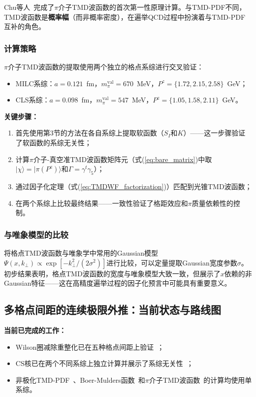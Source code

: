 \documentclass[12pt,a4paper]{ctexart}
\theoremstyle{definition}
\begin{document}
Chu等人~\cite{Chu2023TMDWF}完成了$\pi$介子TMD波函数的首次第一性原理计算。与TMD-PDF不同，TMD波函数是\textbf{概率幅}（而非概率密度），在遍举QCD过程中扮演着与TMD-PDF互补的角色。

\subsubsection{计算策略}

$\pi$介子TMD波函数的提取使用两个独立的格点系综进行交叉验证：
\begin{itemize}
    \item MILC系综：$a = 0.121$~fm，$m_\pi^{\text{val}} = 670$~MeV，$P^z = \{1.72, 2.15, 2.58\}$~GeV；
    \item CLS系综：$a = 0.098$~fm，$m_\pi^{\text{val}} = 547$~MeV，$P^z = \{1.05, 1.58, 2.11\}$~GeV。
\end{itemize}

\textbf{关键步骤：}
\begin{enumerate}
    \item 首先使用第3节的方法在各自系综上提取软函数（$S_I$和$K$）——这一步骤验证了软函数的系综无关性；
    \item 计算$\pi$介子-真空准TMD波函数矩阵元（式(\ref{eq:bare_matrix})中取$|\chi\rangle = |\pi(P^z)\rangle$和$\Gamma = \gamma^t\gamma_5$）；
    \item 通过因子化定理（式(\ref{eq:TMDWF_factorization})）匹配到光锥TMD波函数；
    \item 在两个系综上比较最终结果——一致性验证了格距效应和$\pi$质量依赖性的控制。
\end{enumerate}

\subsubsection{与唯象模型的比较}

将格点TMD波函数与唯象学中常用的Gaussian模型$\Psi(x, k_\perp) \propto \exp[-k_\perp^2/(2\sigma^2)]$进行比较，可以定量提取Gaussian宽度参数$\sigma$。初步结果表明，格点TMD波函数的宽度与唯象模型大致一致，但展示了$x$依赖的非Gaussian特征——这在高精度遍举过程的因子化预言中可能具有重要意义。

\subsection{多格点间距的连续极限外推：当前状态与路线图}

\textbf{当前已完成的工作：}
\begin{itemize}
    \item Wilson圈减除重整化已在五种格点间距上验证~\cite{Zhang2022renormTMD}；
    \item CS核已在两个不同系综上独立计算并展示了系综无关性~\cite{Chu2023soft}；
    \item 非极化TMD-PDF~\cite{He2024unpolTMD}、Boer-Mulders函数~\cite{Ma2025BoerMulders}和$\pi$介子TMD波函数~\cite{Chu2023TMDWF}的计算均使用单系综。
\end{itemize}
\end{document}
